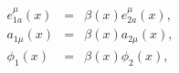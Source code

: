 \begin{equation}\label{DILATON}
\begin{array}{ccc}
e^\mu_{1a}(x) & = & \beta (x) e^\mu_{2a}(x), \\
a_{1\mu}(x)  & = & \beta(x) a_{2\mu}(x), \\
\phi_1(x) & = & \beta(x) \phi_2(x),
\end{array}
\end{equation}

